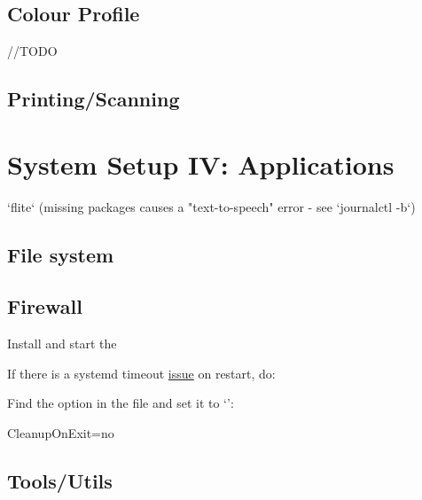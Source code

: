 \subsection{Colour Profile}

//TODO

\subsection{Printing/Scanning}


\section{System Setup IV: Applications}

`flite` (missing packages causes a "text-to-speech" error - see `journalctl -b`)


\subsection{File system}


\subsection{Firewall}

Install  and start the 

If there is a systemd timeout \href{https://bugzilla.redhat.com/show_bug.cgi?id=1294415#c10}{issue} on restart, do:

\begin{blocksection}
	Find the  option in the file and set it to `':\\
	\begin{codeblock}
		CleanupOnExit=no
	\end{codeblock}
\end{blocksection}

\subsection{Tools/Utils}


